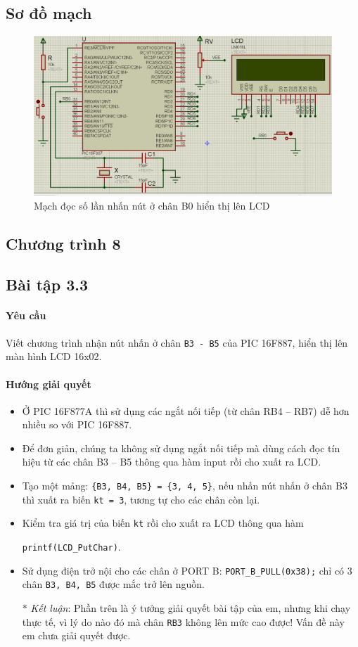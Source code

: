 \subsection*{Sơ đồ mạch}
\begin{figure}[!h]
\begin{center}
\includegraphics[scale=0.5]{bai-3/image/BAI-3-2}
\end{center}
\caption{Mạch đọc số lần nhấn nút ở chân B0 hiển thị lên LCD}
\end{figure}
\newpage
\subsection*{Chương trình 8}

\newpage
\subsection{Bài tập 3.3}
\paragraph{Yêu cầu}Viết chương trình nhận nút nhấn ở chân \verb|B3 - B5| của PIC 16F887, hiển thị lên màn hình LCD 16x02.
\paragraph{Hướng giải quyết}
\begin{itemize}
\item Ở PIC 16F877A thì sử dụng các ngắt nối tiếp (từ chân RB4 -- RB7) dễ hơn nhiều so với PIC 16F887.
\item Để đơn giản, chúng ta không sử dụng ngắt nối tiếp mà dùng cách đọc tín hiệu từ các chân B3 -- B5 thông qua hàm input rồi cho xuất ra LCD.
\item Tạo một mảng: \verb|{B3, B4, B5} = {3, 4, 5}|, nếu nhấn nút nhấn ở chân B3 thì xuất ra biến \verb|kt = 3|, tương tự cho các chân còn lại.
\item Kiểm tra giá trị của biến \verb|kt| rồi cho xuất ra LCD thông qua hàm 

\verb|printf(LCD_PutChar)|.
\item Sử dụng điện trở nội cho các chân ở PORT B: \verb|PORT_B_PULL(0x38);| chỉ có 3 chân \verb|B3, B4, B5| được mắc trở lên nguồn.
\item[$\ast$] \textit{Kết luận}: Phần trên là ý tưởng giải quyết bài tập của em, nhưng khi chạy thực tế, vì lý do nào đó mà chân \verb|RB3| không lên mức cao được! Vấn đề này em chưa giải quyết được.
\end{itemize}
